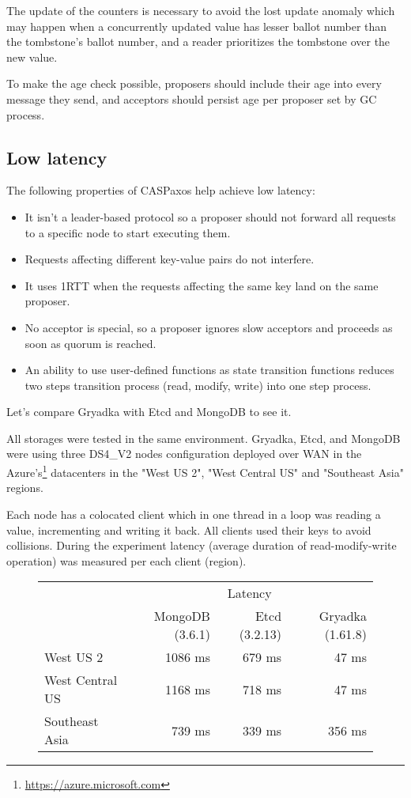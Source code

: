 \documentclass[12pt]{article}
\theoremstyle{definition}
\begin{document}
The update of the counters is necessary to avoid the lost update anomaly which may happen when a concurrently updated value has lesser ballot number than the tombstone's ballot number, and a reader prioritizes the tombstone over the new value.

To make the age check possible, proposers should include their age into every message they send, and acceptors should persist age per proposer set by GC process.

\subsection{Low latency}

The following properties of CASPaxos help achieve low latency:
\begin{itemize}[noitemsep]
  \item It isn't a leader-based protocol so a proposer should not forward all requests to a specific node to start executing them.
  \item Requests affecting different key-value pairs do not interfere.
  \item It uses 1RTT when the requests affecting the same key land on the same proposer.
  \item No acceptor is special, so a proposer ignores slow acceptors and proceeds as soon as quorum is reached.
  \item An ability to use user-defined functions as state transition functions reduces two steps transition process (read, modify, write) into one step process.
\end{itemize}

Let's compare Gryadka with Etcd and MongoDB to see it.

All storages were tested in the same environment. Gryadka, Etcd, and MongoDB were using three DS4\_V2 nodes configuration deployed over WAN in the Azure's\footnote{\href{https://azure.microsoft.com}{https://azure.microsoft.com}} datacenters in the "West US 2", "West Central US" and "Southeast Asia" regions.

Each node has a colocated client which in one thread in a loop was reading a value, incrementing and writing it back. All clients used their keys to avoid collisions. During the experiment latency (average duration of read-modify-write operation) was measured per each client (region).

\begin{figure}[!htb]
  \centering
  \begin{tabular}{c|r|r|r|}
  \cline{2-4}
  & \multicolumn{3}{|c|}{Latency} \\
  \cline{2-4}
  & MongoDB (3.6.1) & Etcd (3.2.13) & Gryadka (1.61.8) \\
  \hline
  \multicolumn{1}{|l|}{West US 2} & 1086 ms & 679 ms & 47 ms \\
  \hline
  \multicolumn{1}{|l|}{West Central US} & 1168 ms & 718 ms & 47 ms \\
  \hline
  \multicolumn{1}{|l|}{Southeast Asia} & 739 ms & 339 ms & 356 ms \\
  \hline
  \end{tabular}
\end{figure}
\end{document}
